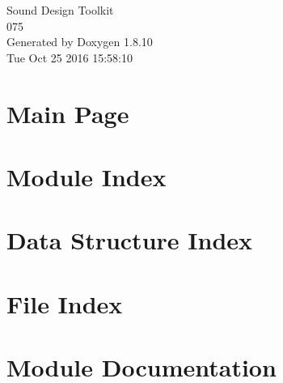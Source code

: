 \documentclass[twoside]{book}
\newcommand{\+}{\discretionary{\mbox{\scriptsize$\hookleftarrow$}}{}{}}
\newcommand{\clearemptydoublepage}{%
  \newpage{\pagestyle{empty}\cleardoublepage}%
}
\begin{document}
\hypersetup{pageanchor=false,
             bookmarks=true,
             bookmarksnumbered=true,
             pdfencoding=unicode
            }
\begin{titlepage}
\vspace*{7cm}
\begin{center}%
{\Large Sound Design Toolkit \\[1ex]\large 075 }\\
\vspace*{1cm}
{\large Generated by Doxygen 1.8.10}\\
\vspace*{0.5cm}
{\small Tue Oct 25 2016 15:58:10}\\
\end{center}
\end{titlepage}
\clearemptydoublepage
\tableofcontents
\clearemptydoublepage
{}
\hypersetup{pageanchor=true}

\chapter{Main Page}
\label{index}\hypertarget{index}{}
\chapter{Module Index}

\chapter{Data Structure Index}

\chapter{File Index}

\chapter{Module Documentation}












































\end{document}
